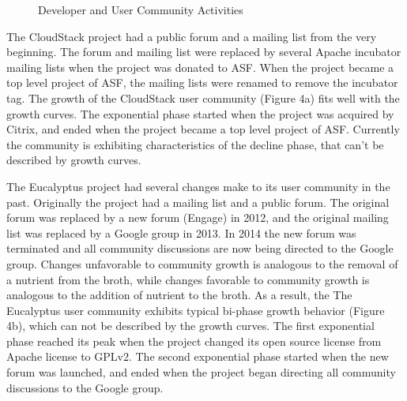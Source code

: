\documentclass[conference]{IEEEtran}
\begin{document}
\begin{figure}[t!]
\centering
  \hspace{50pt} 
  \caption{Developer and User Community Activities} 
  \vspace{-15pt}
  \label{fig:activities} 
\end{figure}

The CloudStack project had a public forum and a mailing list from the very beginning. The forum and mailing list were replaced by several Apache incubator mailing lists when the project was donated to ASF. When the project became a top level project of ASF, the mailing lists were renamed to remove the incubator tag. The growth of the CloudStack user community (Figure 4a) fits well with the growth curves. The exponential phase started when the project was acquired by Citrix, and ended when the project became a top level project of ASF. Currently the community is exhibiting characteristics of the decline phase, that can't be described by growth curves. 

The Eucalyptus project had several changes make to its user community in the past. Originally the project had a mailing list and a public forum. The original forum was replaced by a new forum (Engage) in 2012, and the original mailing list was replaced by a Google group in 2013. In 2014 the new forum was terminated and all community discussions are now being directed to the Google group. Changes unfavorable to community growth is analogous to the removal of a nutrient from the broth, while changes favorable to community growth is analogous to the addition of nutrient to the broth. As a result, the The Eucalyptus user community exhibits typical bi-phase growth behavior (Figure 4b), which can not be described by the growth curves. The first exponential phase reached its peak when the project changed its open source license from Apache license to GPLv2. The second exponential phase started when the new forum was launched, and ended when the project began directing all community discussions to the Google group.
\end{document}
